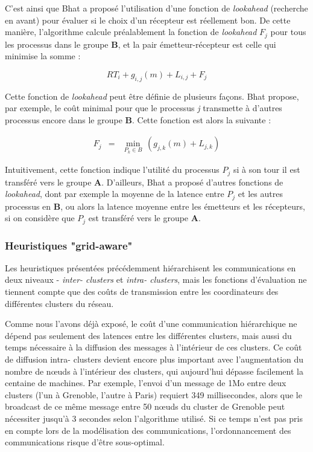 C'est ainsi que Bhat a proposé l'utilisation d'une fonction de \emph{lookahead}
(recherche en avant) pour évaluer si le choix d'un récepteur est réellement
bon. De cette manière, l'algorithme calcule préalablement la fonction
de \emph{lookahead} $F_{j}$ pour tous les processus dans le groupe
\textbf{B}, et la pair émetteur-récepteur est celle qui minimise
la somme :

\[
RT_{i}+g_{i,j}(m)+L_{i,j}+F_{j}\]


Cette fonction de \emph{lookahead} peut être définie de plusieurs
façons. Bhat \cite{Bhat03} propose, par exemple, le coût minimal
pour que le processus \emph{j} transmette à d'autres processus encore
dans le groupe \textbf{B}. Cette fonction est alors la suivante :

\begin{eqnarray*}
	F_{j} & = & \min_{P_{k}\in B}\,(g_{j,k}(m)+L_{j,k})\end{eqnarray*}


Intuitivement, cette fonction indique l'utilité du processus $P_{j}$
si à son tour il est transféré vers le groupe \textbf{A}. D'ailleurs,
Bhat a proposé d'autres fonctions de \emph{lookahead}, dont par exemple
la moyenne de la latence entre $P_{j}$ et les autres processus en
\textbf{B}, ou alors la latence moyenne entre les émetteurs et les
récepteurs, si on considère que $P_{j}$ est transféré vers le groupe
\textbf{A}. 


\subsubsection{Heuristiques "grid-aware"}

Les heuristiques présentées précédemment hiérarchisent les communications en deux niveaux - \emph{inter- clusters}
et \emph{intra- clusters}, mais les fonctions d'évaluation ne tiennent compte que des coûts de transmission entre les coordinateurs
des différentes  clusters du réseau.

Comme nous l'avons déjà exposé, le coût d'une communication
hiérarchique ne dépend pas seulement des latences entre les différentes
 clusters, mais aussi du temps nécessaire à la diffusion des messages
à l'intérieur de ces  clusters. Ce coût de diffusion intra- clusters devient
encore plus important avec l'augmentation du nombre de n{\oe}uds à l'intérieur
des  clusters, qui aujourd'hui dépasse facilement la centaine de machines.
Par exemple, l'envoi d'un message de 1Mo entre deux clusters (l'un à Grenoble, l'autre à Paris) requiert 349 millisecondes, alors que
le broadcast de ce même message entre 50 n{\oe}uds du cluster de Grenoble
peut nécessiter jusqu'à 3 secondes selon l'algorithme
utilisé. Si ce temps n'est pas pris en compte lors de la modélisation
des communications, l'ordonnancement des communications risque d'être
sous-optimal.

